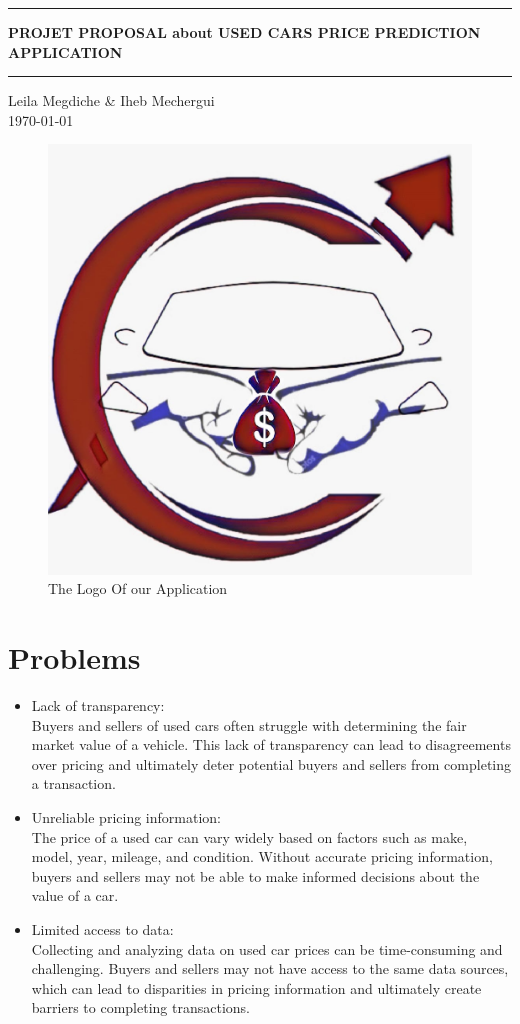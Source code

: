 \documentclass[]{report}   %
\begin{document}
\begin{center}
\hrule
\vspace*{1cm}
\Large \textbf {\LARGE PROJET PROPOSAL about USED CARS PRICE PREDICTION APPLICATION}
\vspace*{1cm}
\hrule
\end{center}
\vspace*{2cm}
\begin{center}
  \large Leila Megdiche \& Iheb Mechergui \\
  \today
  \end{center}
  \vspace*{2cm}
\begin{figure}[H]
  \centering
  \includegraphics[width = 0.4 \linewidth]{Logo_App.jpeg}
  \caption{The Logo Of our Application} \label{exemple-ref-img}
\end{figure}
\vspace*{1cm}
\section{Problems}     %
\begin{itemize}
  \item [\ding{56}] Lack of transparency:\\
  Buyers and sellers of used cars often struggle with determining the fair market value of a vehicle.
  This lack of transparency can lead to disagreements over pricing and ultimately deter potential buyers and sellers from completing a transaction.
  
 \item [\ding{56}] Unreliable pricing information:\\
 The price of a used car can vary widely based on factors such as make, model, year, mileage, and condition. 
 Without accurate pricing information, buyers and sellers may not be able to make informed decisions about the value of a car.
 \item [\ding{56}] Limited access to data:\\
 Collecting and analyzing data on used car prices can be time-consuming and challenging.
 Buyers and sellers may not have access to the same data sources, which can lead to disparities in pricing information and ultimately create barriers to completing transactions.\\
\end{itemize}
\end{document}
